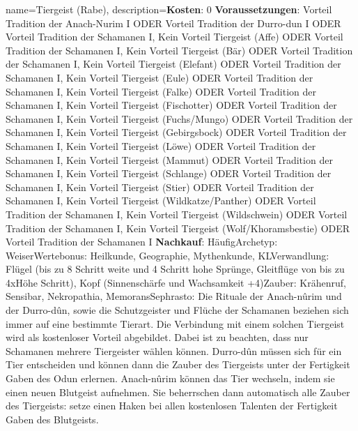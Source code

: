 {
    name={Tiergeist (Rabe)},
    description={\textbf{Kosten}: 0 \textbf{Voraussetzungen}: Vorteil Tradition der Anach-Nurim I ODER Vorteil Tradition der Durro-dun I ODER Vorteil Tradition der Schamanen I, Kein Vorteil Tiergeist (Affe) ODER Vorteil Tradition der Schamanen I, Kein Vorteil Tiergeist (Bär) ODER Vorteil Tradition der Schamanen I, Kein Vorteil Tiergeist (Elefant) ODER Vorteil Tradition der Schamanen I, Kein Vorteil Tiergeist (Eule) ODER Vorteil Tradition der Schamanen I, Kein Vorteil Tiergeist (Falke) ODER Vorteil Tradition der Schamanen I, Kein Vorteil Tiergeist (Fischotter) ODER Vorteil Tradition der Schamanen I, Kein Vorteil Tiergeist (Fuchs/Mungo) ODER Vorteil Tradition der Schamanen I, Kein Vorteil Tiergeist (Gebirgsbock) ODER Vorteil Tradition der Schamanen I, Kein Vorteil Tiergeist (Löwe) ODER Vorteil Tradition der Schamanen I, Kein Vorteil Tiergeist (Mammut) ODER Vorteil Tradition der Schamanen I, Kein Vorteil Tiergeist (Schlange) ODER Vorteil Tradition der Schamanen I, Kein Vorteil Tiergeist (Stier) ODER Vorteil Tradition der Schamanen I, Kein Vorteil Tiergeist (Wildkatze/Panther) ODER Vorteil Tradition der Schamanen I, Kein Vorteil Tiergeist (Wildschwein) ODER Vorteil Tradition der Schamanen I, Kein Vorteil Tiergeist (Wolf/Khoramsbestie) ODER Vorteil Tradition der Schamanen I \textbf{Nachkauf}: Häufig\newline Archetyp: Weiser\newline Wertebonus: Heilkunde, Geographie, Mythenkunde, KL\newline Verwandlung: Flügel (bis zu 8 Schritt weite und 4 Schritt hohe Sprünge, Gleitflüge von bis zu 4xHöhe Schritt), Kopf (Sinnenschärfe und Wachsamkeit +4)\newline Zauber: Krähenruf, Sensibar, Nekropathia, Memorans\newline Sephrasto: Die Rituale der Anach-nûrim und der Durro-dûn, sowie die Schutzgeister und Flüche der Schamanen beziehen sich immer auf eine bestimmte Tierart. Die Verbindung mit einem solchen Tiergeist wird als kostenloser Vorteil abgebildet. Dabei ist zu beachten, dass nur Schamanen mehrere Tiergeister wählen können. Durro-dûn müssen sich für ein Tier entscheiden und können dann die Zauber des Tiergeists unter der Fertigkeit Gaben des Odun erlernen. Anach-nûrim können das Tier wechseln, indem sie einen neuen Blutgeist aufnehmen. Sie beherrschen dann automatisch alle Zauber des Tiergeists: setze einen Haken bei allen kostenlosen Talenten der Fertigkeit Gaben des Blutgeists.}
}


